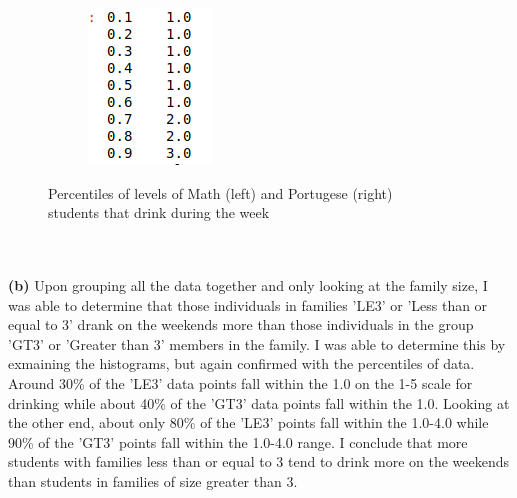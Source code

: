\documentclass[11pt]{article}
\begin{document}
\begin{figure}[h!]
  \hspace{30mm}
  \begin{subfigure}[b]{0.2\linewidth}
    \includegraphics[width=\linewidth]{port_hist.png}
  \end{subfigure}
  \caption{Percentiles of levels of Math (left) and Portugese (right)\\students that drink during the week}
  \label{fig:coffee}
\end{figure} \\ \\
\textbf{(b)} Upon grouping all the data together and only looking at the family size, I was able to determine that those individuals in families 'LE3' or 'Less than or equal to 3' drank on the weekends more than those individuals in the group 'GT3' or 'Greater than 3' members in the family. I was able to determine this by exmaining the histograms, but again confirmed with the percentiles of data. Around 30\% of the 'LE3' data points fall within the 1.0 on the 1-5 scale for drinking while about 40\% of the 'GT3' data points fall within the 1.0. Looking at the other end, about only 80\% of the 'LE3' points fall within the 1.0-4.0 while 90\% of the 'GT3' points fall within the 1.0-4.0 range. I conclude that more students with families less than or equal to 3 tend to drink more on the weekends than students in families of size greater than 3. \\ \\
\end{document}
